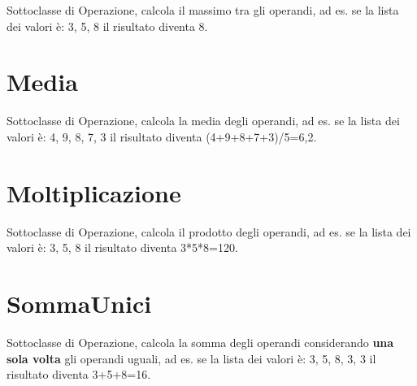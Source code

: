 \documentclass[12pt]{article}
\begin{document}
Sottoclasse di Operazione, calcola il massimo tra gli operandi, ad es. se la lista dei valori è: 3, 5, 8 il risultato diventa 8.

\section{Media}

Sottoclasse di Operazione, calcola la media degli operandi, ad es. se la lista dei valori è: 4, 9, 8, 7, 3 il risultato diventa (4+9+8+7+3)/5=6,2.



\section{Moltiplicazione}

Sottoclasse di Operazione, calcola il prodotto degli operandi, ad es. se la lista dei valori è: 3, 5, 8 il risultato diventa 3*5*8=120.

\section{SommaUnici}

Sottoclasse di Operazione, calcola la somma degli operandi considerando \textbf{una sola volta} gli operandi uguali, ad es. se la lista dei valori è: 3, 5, 8, 3, 3 il risultato diventa 3+5+8=16.


% 
\end{document}
